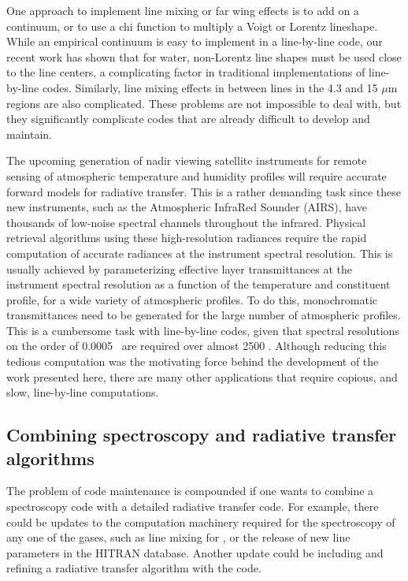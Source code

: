 \documentclass[11pt]{article}
\begin{document}
One approach to implement line mixing or far wing effects is to add on a 
continuum, or to use a chi function to  multiply a Voigt or Lorentz 
lineshape. While an empirical continuum is easy to implement in a 
line-by-line code, our recent
work has shown that for water, non-Lorentz line shapes must be used
close to the line centers, a complicating factor in traditional
implementations of line-by-line codes. Similarly, line mixing effects
in between \cd lines in the 4.3 and 15 $\mu$m regions are also complicated.
These problems are not impossible to deal with, but they significantly 
complicate codes that are already difficult to develop and maintain.

The upcoming generation of nadir viewing satellite instruments for
remote sensing of atmospheric temperature and humidity profiles will
require accurate forward models for radiative transfer.  This is a
rather demanding task since these new instruments, such as the
Atmospheric InfraRed Sounder (AIRS)\cite{air:91}, have thousands of
low-noise spectral channels throughout the infrared.  Physical
retrieval algorithms using these high-resolution radiances require the
rapid computation of accurate radiances at the instrument spectral
resolution.  This is usually achieved by parameterizing effective
layer transmittances at the instrument spectral resolution as a
function of the temperature and constituent profile, for a wide 
variety of atmospheric profiles. To do this, monochromatic transmittances 
need to be generated for the large number of atmospheric profiles. This 
is a cumbersome task with line-by-line codes, given that spectral 
resolutions on the order of 0.0005 \wn\ are required over almost 2500 \wn.  
Although reducing this
tedious computation was the motivating force behind the development of
the work presented here, there are many other applications that
require copious, and slow, line-by-line computations.

\subsection{Combining spectroscopy and radiative transfer algorithms}
The problem of code maintenance is compounded if one wants to combine a 
spectroscopy code with a detailed radiative transfer code. For example, there
could be updates to the computation machinery required for the spectroscopy of
any one of the gases, such as line mixing for \cd, or the release of new
line parameters in the \textsf{HITRAN} database. Another update could be 
including and refining a radiative transfer algorithm with the code.
\end{document}
